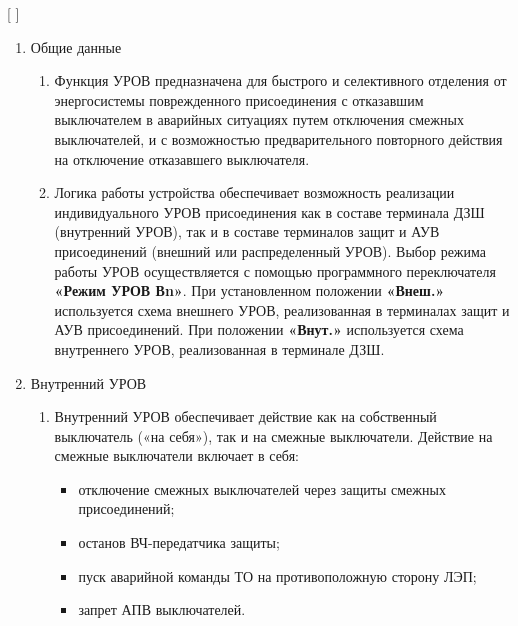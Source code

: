 
[
\def\Num{??}
]

\color{black}

\begin{enumerate}


\item Общие данные

\begin{enumerate}

\item
Функция УРОВ предназначена для быстрого и селективного отделения от энергосистемы поврежденного присоединения с отказавшим выключателем в аварийных ситуациях путем отключения смежных выключателей, и с возможностью предварительного повторного действия на отключение отказавшего выключателя.

\item
Логика работы устройства обеспечивает возможность реализации индивидуального УРОВ присоединения как в составе терминала ДЗШ (внутренний УРОВ), так и в составе терминалов защит и АУВ присоединений (внешний или распределенный УРОВ).
Выбор режима работы УРОВ осуществляется с помощью программного переключателя \textbf{«Режим УРОВ Вn»}.
При установленном положении \textbf{«Внеш.»} используется схема внешнего УРОВ, реализованная в терминалах защит и АУВ присоединений.
При положении \textbf{«Внут.»} используется схема внутреннего УРОВ, реализованная в терминале ДЗШ.

\end {enumerate}


\item Внутренний УРОВ

\begin{enumerate}

\item
Внутренний УРОВ обеспечивает действие как на собственный выключатель («на себя»), так и на смежные выключатели.
Действие на смежные выключатели включает в себя:
\begin{itemize}
\item отключение смежных выключателей через защиты смежных присоединений;
\item останов ВЧ-передатчика защиты;
\item пуск аварийной команды ТО на противоположную сторону ЛЭП;
\item запрет АПВ выключателей.
\end{itemize}


\end{enumerate}
\end{enumerate}
